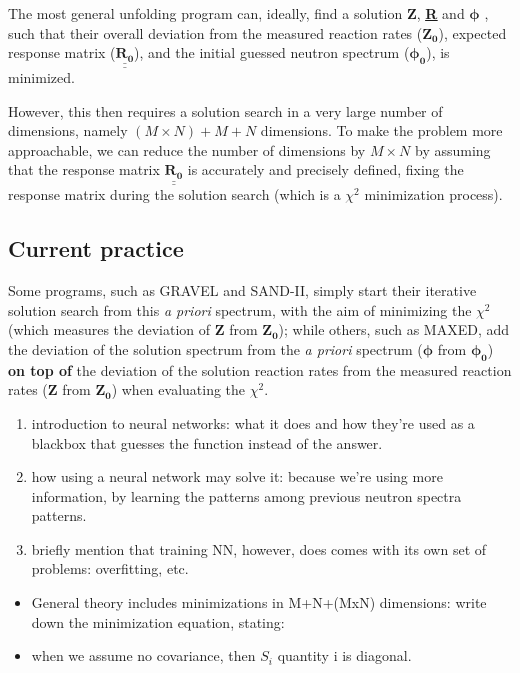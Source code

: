 \documentclass[a4paper, 12pt]{article}
\newcommand{\matr}[1]{\underline{\underline{\textbf{#1}}}}
\newcommand{\ve}[1]{\boldsymbol{#1}}
\begin{document}
The most general unfolding program can, ideally, find a solution $\ve{Z}$, \matr{R} and $\ve{\phi}$ \cite{theorypdf}, such that their overall deviation from the measured reaction rates ($\ve{Z_0}$), expected response matrix ($\underline{\underline{\mathbf{R_0}}}$), and the initial guessed neutron spectrum ($\ve{\phi_0}$), is minimized.

However, this then requires a solution search in a very large number of dimensions, namely $(M\times N)+M+N$ dimensions. To make the problem more approachable, we can reduce the number of dimensions by $M\times N$ by assuming that the response matrix $\underline{\underline{\mathbf{R_0}}}$ is accurately and precisely defined, fixing the response matrix during the solution search (which is a $\chi^2$ minimization process).

\subsection{Current practice}
Some programs, such as GRAVEL and SAND-II, simply start their iterative solution search from this \emph{a priori} spectrum, with the aim of minimizing the $\chi^2$ (which measures the deviation of $\ve{Z}$ from $\ve{Z_0}$); while others, such as MAXED, add the deviation of the solution spectrum from the \emph{a priori} spectrum ($\ve{\phi}$ from $\ve{\phi_0}$) \textbf{on top of} the deviation of the solution reaction rates from the measured reaction rates ($\ve{Z}$ from $\ve{Z_0}$) when evaluating the $\chi^2$.




\begin{enumerate}
    \item introduction to neural networks: what it does and how they're used as a blackbox that guesses the function instead of the answer.
    \item how using a neural network may solve it: because we're using more information, by learning the patterns among previous neutron spectra patterns.
    \item briefly mention that training NN, however, does comes with its own set of problems: overfitting, etc.

\end{enumerate}


\begin{itemize}
    \item General theory includes minimizations in M+N+(MxN) dimensions: write down the minimization equation, stating:
    \item when we assume no covariance, then $S_i$ quantity i is diagonal.
\end{itemize}
\end{document}
